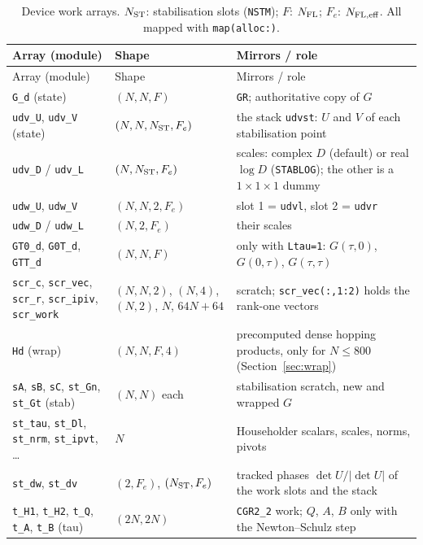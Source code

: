\begin{small}
\begin{longtable}{@{}p{3.3cm}p{4.0cm}p{7.6cm}@{}}
\caption{Device work arrays. $N_{\rm ST}$: stabilisation slots (\texttt{NSTM}); $F$: $N_{\rm FL}$; $F_e$: $N_{\rm FL,eff}$. All mapped with \texttt{map(alloc:)}.}\label{tab:work}\\
\toprule
Array (module) & Shape & Mirrors / role \\
\midrule\endfirsthead
\toprule Array (module) & Shape & Mirrors / role \\ \midrule\endhead
\texttt{G\_d} (state) & $(N,N,F)$ & \texttt{GR}; authoritative copy of $G$ \\
\texttt{udv\_U}, \texttt{udv\_V} (state) & $(N,N,N_{\rm ST},F_e)$ & the stack \texttt{udvst}: $U$ and $V$ of each stabilisation point \\
\texttt{udv\_D} / \texttt{udv\_L} & $(N,N_{\rm ST},F_e)$ & scales: complex $D$ (default) or real $\log D$ (\texttt{STABLOG}); the other is a $1\times1\times1$ dummy \\
\texttt{udw\_U}, \texttt{udw\_V} & $(N,N,2,F_e)$ & slot 1 = \texttt{udvl}, slot 2 = \texttt{udvr} \\
\texttt{udw\_D} / \texttt{udw\_L} & $(N,2,F_e)$ & their scales \\
\texttt{GT0\_d}, \texttt{G0T\_d}, \texttt{GTT\_d} & $(N,N,F)$ & only with \texttt{Ltau=1}: $G(\tau,0)$, $G(0,\tau)$, $G(\tau,\tau)$ \\
\texttt{scr\_c}, \texttt{scr\_vec}, \texttt{scr\_r}, \texttt{scr\_ipiv}, \texttt{scr\_work} & $(N,N,2)$, $(N,4)$, $(N,2)$, $N$, $64N+64$ & scratch; \texttt{scr\_vec(:,1:2)} holds the rank-one vectors \\
\texttt{Hd} (wrap) & $(N,N,F,4)$ & precomputed dense hopping products, only for $N\le800$ (Section~\ref{sec:wrap}) \\
\texttt{sA}, \texttt{sB}, \texttt{sC}, \texttt{st\_Gn}, \texttt{st\_Gt} (stab) & $(N,N)$ each & stabilisation scratch, new and wrapped $G$ \\
\texttt{st\_tau}, \texttt{st\_Dl}, \texttt{st\_nrm}, \texttt{st\_ipvt}, \ldots & $N$ & Householder scalars, scales, norms, pivots \\
\texttt{st\_dw}, \texttt{st\_dv} & $(2,F_e)$, $(N_{\rm ST},F_e)$ & tracked phases $\det U/|\det U|$ of the work slots and the stack \\
\texttt{t\_H1}, \texttt{t\_H2}, \texttt{t\_Q}, \texttt{t\_A}, \texttt{t\_B} (tau) & $(2N,2N)$ & \texttt{CGR2\_2} work; $Q$, $A$, $B$ only with the Newton--Schulz step \\

\end{longtable}
\end{small}
